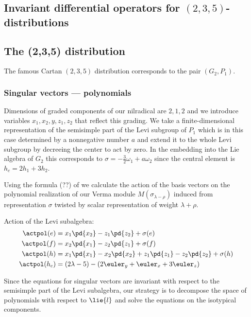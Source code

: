 
\begin{appendices}

\chapter{Invariant differential operators for $(2,3,5)$-distributions}


\section{The (2,3,5) distribution}

The famous Cartan $(2,3,5)$ distribution corresponds to the pair $(G_2, P_1)$.

\subsection{Singular vectors --- polynomials}

Dimensions of graded components of our nilradical are $2, 1, 2$ and we introduce variables $x_1, x_2, y, z_1, z_2$ that reflect this grading. We take a finite-dimensional representation of the semisimple part of the Levi subgroup of $P_1$ which is in this case determined by a nonnegative number $a$ and extend it to the whole Levi subgroup by decreeing the center to act by zero. In the embedding into the Lie algebra of $G_2$ this corresponds to $\sigma = -\frac{3}{2} \omega_1 + a \omega_2$ since the central element is $h_c = 2h_1 + 3h_2$.

Using the formula (??) of \cite{ks_2015} we calculate the action of the basis vectors on the polynomial realization of our Verma module $M(\sigma_{\lambda-\rho})$ induced from representation $\sigma$ twisted by scalar representation of weight $\lambda + \rho$.

Action of the Levi subalgebra:
\begin{align}
    \actpol(e) &= x_1 \pd{x_2} - z_1 \pd{z_2} + \sigma(e) \\
    \actpol(f) &= x_2 \pd{x_1} - z_2 \pd{z_1} + \sigma(f)\\
    \actpol(h) &= x_1 \pd{x_1} - x_2 \pd{x_2} + z_1 \pd{z_1} - z_2 \pd{z_2} + \sigma(h) \\
    \actpol(h_c) &= (2\lambda -5) - (2 \euler_y + \euler_x + 3 \euler_z)
\end{align}

Since the equations for singular vectors are invariant with respect to the semisimple part of the Levi subalgebra, our strategy is to decompose the space of polynomials with respect to $\lie{l}$ and solve the equations on the isotypical components.


\end{appendices}
